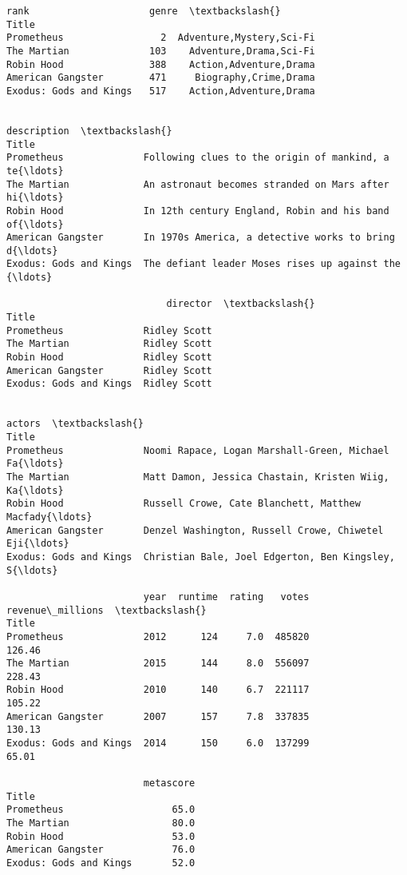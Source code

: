 \documentclass[11pt]{article}
\makeatletter
\newcommand{\boxspacing}{\kern\kvtcb@left@rule\kern\kvtcb@boxsep}
\newcommand{\prompt}[4]{
        {\ttfamily\llap{{\color{#2}[#3]:\hspace{3pt}#4}}\vspace{-\baselineskip}}
    }
\makeatother
\begin{document}
            \begin{tcolorbox}[breakable, size=fbox, boxrule=.5pt, pad at break*=1mm, opacityfill=0]
\prompt{Out}{outcolor}{45}{\boxspacing}
\begin{Verbatim}[commandchars=\\\{\}]
                        rank                     genre  \textbackslash{}
Title
Prometheus                 2  Adventure,Mystery,Sci-Fi
The Martian              103    Adventure,Drama,Sci-Fi
Robin Hood               388    Action,Adventure,Drama
American Gangster        471     Biography,Crime,Drama
Exodus: Gods and Kings   517    Action,Adventure,Drama

                                                              description  \textbackslash{}
Title
Prometheus              Following clues to the origin of mankind, a te{\ldots}
The Martian             An astronaut becomes stranded on Mars after hi{\ldots}
Robin Hood              In 12th century England, Robin and his band of{\ldots}
American Gangster       In 1970s America, a detective works to bring d{\ldots}
Exodus: Gods and Kings  The defiant leader Moses rises up against the {\ldots}

                            director  \textbackslash{}
Title
Prometheus              Ridley Scott
The Martian             Ridley Scott
Robin Hood              Ridley Scott
American Gangster       Ridley Scott
Exodus: Gods and Kings  Ridley Scott

                                                                   actors  \textbackslash{}
Title
Prometheus              Noomi Rapace, Logan Marshall-Green, Michael Fa{\ldots}
The Martian             Matt Damon, Jessica Chastain, Kristen Wiig, Ka{\ldots}
Robin Hood              Russell Crowe, Cate Blanchett, Matthew Macfady{\ldots}
American Gangster       Denzel Washington, Russell Crowe, Chiwetel Eji{\ldots}
Exodus: Gods and Kings  Christian Bale, Joel Edgerton, Ben Kingsley, S{\ldots}

                        year  runtime  rating   votes  revenue\_millions  \textbackslash{}
Title
Prometheus              2012      124     7.0  485820            126.46
The Martian             2015      144     8.0  556097            228.43
Robin Hood              2010      140     6.7  221117            105.22
American Gangster       2007      157     7.8  337835            130.13
Exodus: Gods and Kings  2014      150     6.0  137299             65.01

                        metascore
Title
Prometheus                   65.0
The Martian                  80.0
Robin Hood                   53.0
American Gangster            76.0
Exodus: Gods and Kings       52.0
\end{Verbatim}
\end{tcolorbox}
        
\end{document}
